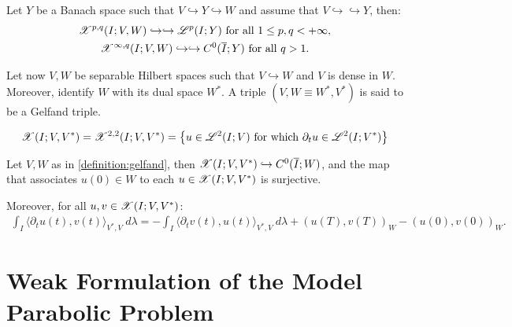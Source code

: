 \begin{theorem}
    Let $Y$ be a Banach space such that $V \hookrightarrow Y \hookrightarrow W$ and assume that $V \hookrightarrow \hookrightarrow Y$, then:
    \begin{gather}
        \mathscr{X}^{p, q}(I; V, W) \hookrightarrow \hookrightarrow \mathscr{L}^{p}(I; Y) \text{ for all } 1 \leq p, q < +\infty,\\
        \mathscr{X}^{\infty, q}(I; V, W) \hookrightarrow \hookrightarrow C^0(\overline{I}; Y) \text{ for all } q > 1.
    \end{gather}
\end{theorem}

\begin{definition} \label{definition:gelfand}
    Let now $V, W$ be separable Hilbert spaces such that $V \hookrightarrow W$ and $V$ is dense in $W$. Moreover, identify $W$ with its dual space $W^*$. A triple $\left( V, W \equiv W^*, V^* \right)$ is said to be a Gelfand triple.
\end{definition}

\begin{definition}[$\SpaceX(I; V, V^*)$] \label{definition:x}
    \begin{gather}
        \mathscr{X}(I; V, V^*) = \mathscr{X}^{2, 2}(I; V, V^*) = \left\{ u \in \mathscr{L}^{2}(I; V) \text{ for which } \partial_t u \in \mathscr{L}^{2}(I; V^*) \right\}
    \end{gather}
\end{definition}

\begin{theorem}
    Let $V, W$ as in \cref{definition:gelfand}, then \newline \nobreak $\mathscr{X}(I; V, V^*) \hookrightarrow C^0(\overline{I};W)$, and the map that associates $u(0) \in W$ to each $u \in \mathscr{X}(I; V, V^*)$ is surjective.

    Moreover, for all $u, v \in \mathscr{X}(I; V, V^*)$:
    \begin{gather}
        \int_I \langle \partial_t u(t), v(t) \rangle_{V^*, V} ~ d \lambda = - \int_I \langle \partial_t v(t), u(t) \rangle_{V^*, V} ~ d \lambda + \left( u(T), v(T) \right)_W - \left( u(0), v(0) \right)_W.
    \end{gather}
\end{theorem}

\newpage
\section{Weak Formulation of the Model Parabolic Problem}

